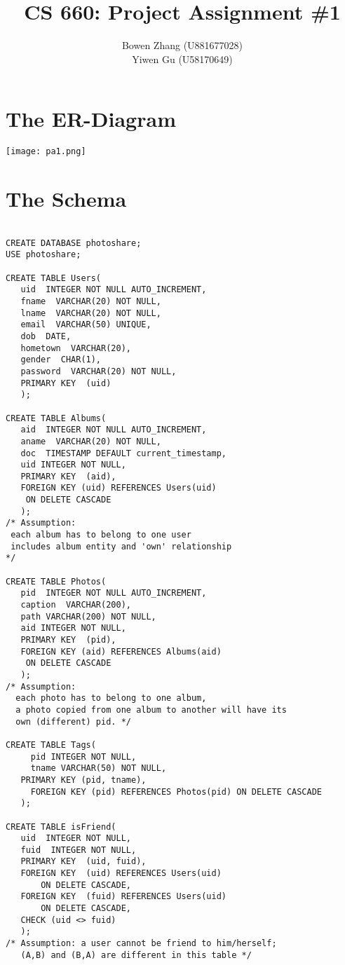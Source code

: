 \documentclass[11pt, oneside]{article}   	%
\title{CS 660: Project Assignment \#1}
\author{Bowen Zhang (U881677028) \\Yiwen Gu (U58170649)}
\date{}							%
\begin{document}
\maketitle
\section{The ER-Diagram}				
\texttt{[image: pa1.png]} 

\section{The Schema}
\begin{lstlisting}[frame=none]		 	% Start the code-block SQL

CREATE DATABASE photoshare;
USE photoshare;

CREATE TABLE Users(
   uid  INTEGER NOT NULL AUTO_INCREMENT,
   fname  VARCHAR(20) NOT NULL,
   lname  VARCHAR(20) NOT NULL,
   email  VARCHAR(50) UNIQUE,
   dob  DATE,
   hometown  VARCHAR(20),
   gender  CHAR(1),
   password  VARCHAR(20) NOT NULL,
   PRIMARY KEY  (uid)
   );

CREATE TABLE Albums(
   aid  INTEGER NOT NULL AUTO_INCREMENT,
   aname  VARCHAR(20) NOT NULL,
   doc  TIMESTAMP DEFAULT current_timestamp,
   uid INTEGER NOT NULL,
   PRIMARY KEY  (aid),
   FOREIGN KEY (uid) REFERENCES Users(uid)
  	ON DELETE CASCADE
   );
/* Assumption:
 each album has to belong to one user 
 includes album entity and 'own' relationship
*/

CREATE TABLE Photos(
   pid  INTEGER NOT NULL AUTO_INCREMENT,
   caption  VARCHAR(200),
   path VARCHAR(200) NOT NULL,
   aid INTEGER NOT NULL,
   PRIMARY KEY  (pid),
   FOREIGN KEY (aid) REFERENCES Albums(aid)
  	ON DELETE CASCADE
   );
/* Assumption:
  each photo has to belong to one album, 
  a photo copied from one album to another will have its 
  own (different) pid. */

CREATE TABLE Tags(
	 pid INTEGER NOT NULL,
	 tname VARCHAR(50) NOT NULL,
   PRIMARY KEY (pid, tname),
	 FOREIGN KEY (pid) REFERENCES Photos(pid) ON DELETE CASCADE
   );

CREATE TABLE isFriend(
   uid  INTEGER NOT NULL,
   fuid  INTEGER NOT NULL,
   PRIMARY KEY  (uid, fuid),
   FOREIGN KEY  (uid) REFERENCES Users(uid)
   	   ON DELETE CASCADE,
   FOREIGN KEY  (fuid) REFERENCES Users(uid)
   	   ON DELETE CASCADE,
   CHECK (uid <> fuid)
   );
/* Assumption: a user cannot be friend to him/herself;  
   (A,B) and (B,A) are different in this table */


\end{lstlisting}
\end{document}
